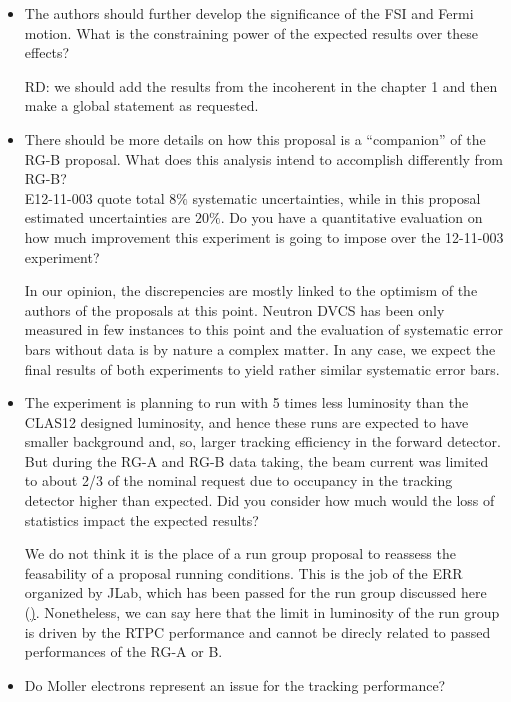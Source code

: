   \begin{itemize}
  
 \item The authors should further develop the significance of the FSI and Fermi motion. What is the constraining power of the expected results over these effects?

{\color{red} RD: we should add the results from the incoherent in the chapter 1 and then make a global statement as requested. }

\item There should be more details  on how this   proposal is a ``companion'' of the RG-B proposal. What does this analysis intend to accomplish differently from RG-B? 
\\ E12-11-003 quote total $8\%$ systematic uncertainties, while in this proposal estimated uncertainties are $20\%$. Do you have a quantitative evaluation on how much improvement this experiment is going to impose over the 12-11-003 experiment?

{\color{red} In our opinion, the discrepencies are mostly linked to the optimism of the authors of the proposals at this
point. Neutron DVCS has been only measured in few instances to this point and the evaluation of systematic 
error bars without data is by nature a complex matter. In any case, we expect the final results of both 
experiments to yield rather similar systematic error bars.}
 
 \item The experiment is planning to run with 5 times less luminosity than the CLAS12 designed luminosity, and hence these runs are expected to have smaller background and, so, larger tracking efficiency in the forward detector. \\
 But during the RG-A and RG-B data taking, the beam current was limited to about 2/3 of the nominal request due to occupancy in the tracking detector higher than expected. Did you consider how much would the loss of statistics impact the expected results? 
 
{\color{red} We do not think it is the place of a run group proposal to reassess the feasability of a proposal running
conditions. This is the job of the ERR organized by JLab, which has been passed for the run group discussed
here (\href{}). Nonetheless, we can say here that the limit in luminosity of the run group is driven by the
RTPC performance and cannot be direcly related to passed performances of the RG-A or B.}

 \item Do Moller electrons represent an issue for the tracking performance? 


\end{itemize}
